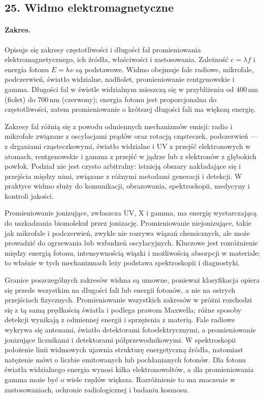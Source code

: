 \documentclass[11pt,a4paper]{article}
\begin{document}
\subsection{25. Widmo elektromagnetyczne}
\paragraph{Zakres.} Opisuje się zakresy częstotliwości i długości fal promieniowania elektromagnetycznego, ich źródła, właściwości i zastosowania. Zależność $c=\lambda f$ i energia fotonu $E=h\nu$ są podstawowe. Widmo obejmuje fale radiowe, mikrofale, podczerwień, światło widzialne, nadfiolet, promieniowanie rentgenowskie i gamma. Długości fal w świetle widzialnym mieszczą się w przybliżeniu od $400\,\mathrm{nm}$ (fiolet) do $700\,\mathrm{nm}$ (czerwony); energia fotonu jest proporcjonalna do częstotliwości, zatem promieniowanie o krótszej długości fali ma większą energię.\par
Zakresy fal różnią się z powodu odmiennych mechanizmów emisji: radio i mikrofale związane z oscylacjami prądów oraz rotacją cząsteczek, podczerwień — z drganiami cząsteczkowymi, światło widzialne i UV z przejść elektronowych w atomach, rentgenowskie i gamma z przejść w jądrze lub z elektronów z głębokich powłok. Podział nie jest czysto arbitralny: istnieją obszary nakładające się i przejścia między nimi, związane z różnymi metodami generacji i detekcji. W praktyce widmo służy do komunikacji, obrazowania, spektroskopii, medycyny i kontroli jakości.\par
Promieniowanie jonizujące, zwłaszcza UV, X i gamma, ma energię wystarczającą do uszkadzania biomolekuł przez jonizację. Promieniowanie niejonizujące, takie jak mikrofale i podczerwień, zwykle nie rozrywa wiązań chemicznych, ale może prowadzić do ogrzewania lub wzbudzeń oscylacyjnych. Kluczowe jest rozróżnienie między energią fotonu, intensywnością wiązki i możliwością absorpcji w materiale; to właśnie w tych mechanizmach leży podstawa spektroskopii i diagnostyki.\par

Granice poszczególnych zakresów widma są umowne, ponieważ klasyfikacja opiera się przede wszystkim na długości fali lub energii fotonów, a nie na ostrych przejściach fizycznych. Promieniowanie wszystkich zakresów w próżni rozchodzi się z tą samą prędkością światła i podlega prawom Maxwella; różne sposoby detekcji wynikają z odmiennej energii i sprzężenia z materią. Fale radiowe wykrywa się antenami, światło detektorami fotoelektrycznymi, a promieniowanie jonizujące licznikami i detektorami półprzewodnikowymi. W spektroskopii położenie linii widmowych ujawnia strukturę energetyczną źródła, natomiast natężenie mówi o liczbie emitowanych lub pochłanianych fotonów. Dla fotonu światła widzialnego energia wynosi kilka elektronowoltów, a dla promieniowania gamma może być o wiele rzędów większa. Rozróżnienie to ma znaczenie w zastosowaniach, ochronie radiologicznej i badaniu kosmosu.
\par
\end{document}
